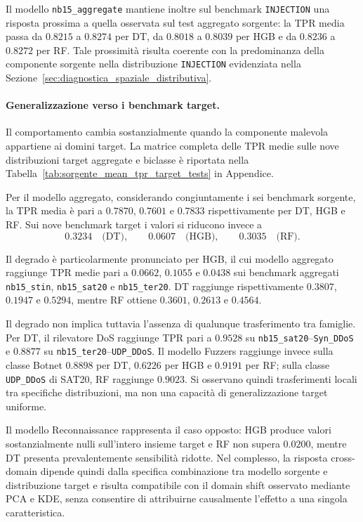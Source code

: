 Il modello \texttt{nb15\_aggregate} mantiene inoltre sul benchmark \texttt{INJECTION} una risposta prossima a quella osservata sul test aggregato sorgente: la TPR media passa da $0.8215$ a $0.8274$ per DT, da $0.8018$ a $0.8039$ per HGB e da $0.8236$ a $0.8272$ per RF. 
Tale prossimità risulta coerente con la predominanza della componente sorgente nella distribuzione \texttt{INJECTION} evidenziata nella Sezione~\ref{sec:diagnostica_spaziale_distributiva}.

\paragraph{Generalizzazione verso i benchmark target.}
Il comportamento cambia sostanzialmente quando la componente malevola appartiene ai domini target. 
La matrice completa delle TPR medie sulle nove distribuzioni target aggregate e biclasse è riportata nella Tabella~\ref{tab:sorgente_mean_tpr_target_tests} in Appendice.

Per il modello aggregato, considerando congiuntamente i sei benchmark sorgente, la TPR media è pari a $0.7870$, $0.7601$ e $0.7833$ rispettivamente per DT, HGB e RF. 
Sui nove benchmark target i valori si riducono invece a
\[
    0.3234 \quad \text{(DT)}, \qquad
    0.0607 \quad \text{(HGB)}, \qquad
    0.3035 \quad \text{(RF)}.
\]

Il degrado è particolarmente pronunciato per HGB, il cui modello aggregato raggiunge TPR medie pari a $0.0662$, $0.1055$ e $0.0438$ sui benchmark aggregati \texttt{nb15\_stin}, \texttt{nb15\_sat20} e \texttt{nb15\_ter20}. 
DT raggiunge rispettivamente $0.3807$, $0.1947$ e $0.5294$, mentre RF ottiene $0.3601$, $0.2613$ e $0.4564$.

Il degrado non implica tuttavia l'assenza di qualunque trasferimento tra famiglie. 
Per DT, il rilevatore DoS raggiunge TPR pari a $0.9528$ su \texttt{nb15\_sat20}--\texttt{Syn\_DDoS} e $0.8877$ su \texttt{nb15\_ter20}--\texttt{UDP\_DDoS}. 
Il modello Fuzzers raggiunge invece sulla classe Botnet $0.8898$ per DT, $0.6226$ per HGB e $0.9191$ per RF; sulla classe \texttt{UDP\_DDoS} di SAT20, RF raggiunge $0.9023$.
Si osservano quindi trasferimenti locali tra specifiche distribuzioni, ma non una capacità di generalizzazione target uniforme.

Il modello Reconnaissance rappresenta il caso opposto: HGB produce valori sostanzialmente nulli sull'intero insieme target e RF non supera $0.0200$, mentre DT presenta prevalentemente sensibilità ridotte. 
Nel complesso, la risposta cross-domain dipende quindi dalla specifica combinazione tra modello sorgente e distribuzione target e risulta compatibile con il domain shift osservato mediante PCA e KDE, senza consentire di attribuirne causalmente l'effetto a una singola caratteristica.

